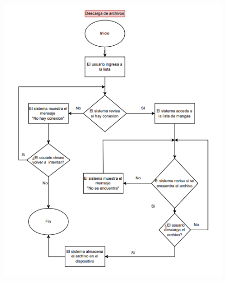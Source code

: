 \documentclass[12pt]{article}
\begin{document}
\begin{figure}[htbp]
	\centering
		\includegraphics[width=1.00\textwidth]{Screenshot 2023-10-05 114715.png}
	\label{fig:Screenshot 2023-10-05 114715}
\end{figure}
\end{document}
